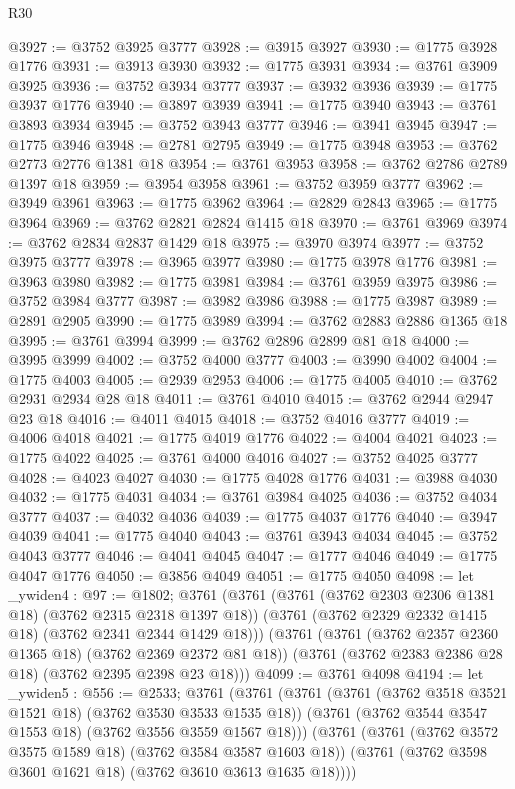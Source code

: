 \begin{lexlean}{R30}
\begin{coremodule}
{{{{{@3927 := @3752 @3925 @3777
@3928 := @3915 @3927
@3930 := @1775 @3928 @1776
@3931 := @3913 @3930
@3932 := @1775 @3931
@3934 := @3761 @3909 @3925
@3936 := @3752 @3934 @3777
@3937 := @3932 @3936
@3939 := @1775 @3937 @1776
@3940 := @3897 @3939
@3941 := @1775 @3940
@3943 := @3761 @3893 @3934
@3945 := @3752 @3943 @3777
@3946 := @3941 @3945
@3947 := @1775 @3946
@3948 := @2781 @2795
@3949 := @1775 @3948
@3953 := @3762 @2773 @2776 @1381 @18
@3954 := @3761 @3953
@3958 := @3762 @2786 @2789 @1397 @18
@3959 := @3954 @3958
@3961 := @3752 @3959 @3777
@3962 := @3949 @3961
@3963 := @1775 @3962
@3964 := @2829 @2843
@3965 := @1775 @3964
@3969 := @3762 @2821 @2824 @1415 @18
@3970 := @3761 @3969
@3974 := @3762 @2834 @2837 @1429 @18
@3975 := @3970 @3974
@3977 := @3752 @3975 @3777
@3978 := @3965 @3977
@3980 := @1775 @3978 @1776
@3981 := @3963 @3980
@3982 := @1775 @3981
@3984 := @3761 @3959 @3975
@3986 := @3752 @3984 @3777
@3987 := @3982 @3986
@3988 := @1775 @3987
@3989 := @2891 @2905
@3990 := @1775 @3989
@3994 := @3762 @2883 @2886 @1365 @18
@3995 := @3761 @3994
@3999 := @3762 @2896 @2899 @81 @18
@4000 := @3995 @3999
@4002 := @3752 @4000 @3777
@4003 := @3990 @4002
@4004 := @1775 @4003
@4005 := @2939 @2953
@4006 := @1775 @4005
@4010 := @3762 @2931 @2934 @28 @18
@4011 := @3761 @4010
@4015 := @3762 @2944 @2947 @23 @18
@4016 := @4011 @4015
@4018 := @3752 @4016 @3777
@4019 := @4006 @4018
@4021 := @1775 @4019 @1776
@4022 := @4004 @4021
@4023 := @1775 @4022
@4025 := @3761 @4000 @4016
@4027 := @3752 @4025 @3777
@4028 := @4023 @4027
@4030 := @1775 @4028 @1776
@4031 := @3988 @4030
@4032 := @1775 @4031
@4034 := @3761 @3984 @4025
@4036 := @3752 @4034 @3777
@4037 := @4032 @4036
@4039 := @1775 @4037 @1776
@4040 := @3947 @4039
@4041 := @1775 @4040
@4043 := @3761 @3943 @4034
@4045 := @3752 @4043 @3777
@4046 := @4041 @4045
@4047 := @1777 @4046
@4049 := @1775 @4047 @1776
@4050 := @3856 @4049
@4051 := @1775 @4050
@4098 := let _ywiden4 : @97 := @1802;
  @3761
    (@3761
      (@3761 (@3762 @2303 @2306 @1381 @18) (@3762 @2315 @2318 @1397 @18))
      (@3761 (@3762 @2329 @2332 @1415 @18) (@3762 @2341 @2344 @1429 @18)))
    (@3761
      (@3761 (@3762 @2357 @2360 @1365 @18) (@3762 @2369 @2372 @81 @18))
      (@3761 (@3762 @2383 @2386 @28 @18) (@3762 @2395 @2398 @23 @18)))
@4099 := @3761 @4098
@4194 := let _ywiden5 : @556 := @2533;
  @3761
    (@3761
      (@3761
        (@3761 (@3762 @3518 @3521 @1521 @18) (@3762 @3530 @3533 @1535 @18))
        (@3761 (@3762 @3544 @3547 @1553 @18) (@3762 @3556 @3559 @1567 @18)))
      (@3761
        (@3761 (@3762 @3572 @3575 @1589 @18) (@3762 @3584 @3587 @1603 @18))
        (@3761 (@3762 @3598 @3601 @1621 @18) (@3762 @3610 @3613 @1635 @18))))
}}}}}
\end{coremodule}
\end{lexlean}
